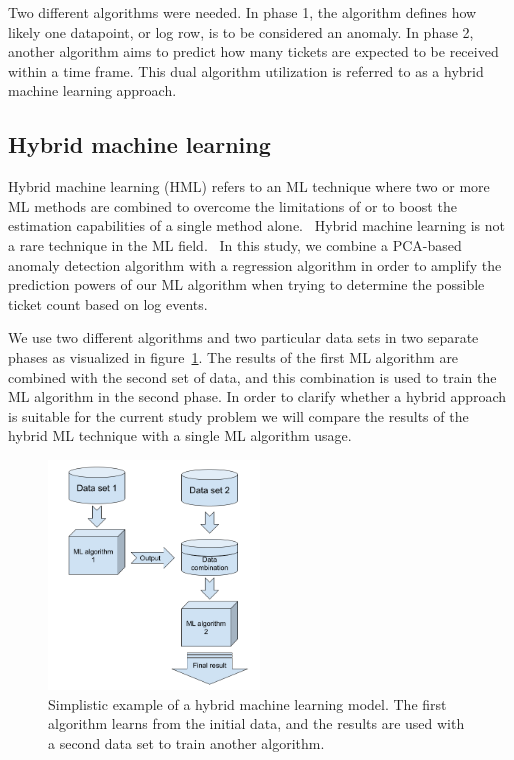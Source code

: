 Two different algorithms were needed.
In phase 1,
the algorithm defines how likely one datapoint, or log row,
is to be considered an anomaly.
In phase 2,
another algorithm aims to predict
how many tickets are expected to be received
within a time frame.
This dual algorithm utilization is referred to as a hybrid machine learning approach.~\cite{tsai2010credit}




\subsection{Hybrid machine learning}\label{subsec:pipe-hybrid-ml}

Hybrid machine learning (HML)
refers to an ML technique
where two or more ML methods are combined
to overcome the limitations of
or to boost the estimation capabilities of
a single method alone.~\cite{Anifowose2020hml}
Hybrid machine learning is not a rare technique in the ML field.~\cite{shon2007hybrid,tsai2010credit,mohan2019effective,
    hsieh2005hybrid,jain2007hybrid,kim2007hybrid,lee2002credit,malhotra2002differentiating}
In this study,
we combine a PCA-based anomaly detection algorithm
with a regression algorithm
in order to amplify the prediction powers of our ML algorithm
when trying to determine the possible ticket count
based on log events.

We use two different algorithms and two particular data sets
in two separate phases as visualized in figure~\ref{fig:hybrid-ml-model}.
The results of the first ML algorithm are combined
with the second set of data,
and this combination is used to train the ML algorithm in the second phase.
In order to clarify whether a hybrid approach is suitable for the current study problem
we will compare the results of the hybrid ML technique
with a single ML algorithm usage.

\begin{figure}[htb]
    \centering
    \includegraphics[width=0.5\textwidth,]{./appendices/hybrid-ml-model}
    \caption{Simplistic example of a hybrid machine learning model.
    The first algorithm learns from the initial data,
        and the results are used with a second data set to train another algorithm.
        \label{fig:hybrid-ml-model}}
\end{figure}


